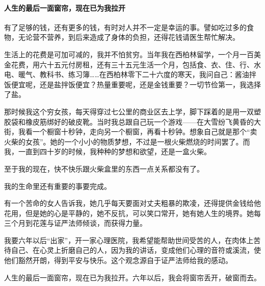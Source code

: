 \paragraph*{人生的最后一面窗帘，现在已为我拉开}
\par 有了足够的钱，还有更多的钱，有时对人并不一定是幸运的事。譬如吃过多的食物，无论营不营养，到后来造成了身体的负担，还得花钱请医生帮忙解决。
\par 生活上的花费是可加可减的，我并不怕贫穷。当年我在西柏林留学，一个月一百美金花费，用六十五元付房租，还有三十五元生活一个月，包括食、衣、住、行、水电、暖气、教科书、练习簿……在西柏林零下二十六度的寒天，我问自己：酱油拌饭便宜呢，还是盐拌饭便宜？热量重要呢，还是金钱重要？一切节俭第一，我选择了盐。
\par 那时候我这个穷女孩，每天得穿过七公里的商业区去上学，脚下踩着的是用一双塑胶袋和橡皮筋绑好的破皮靴。当时我总跟自己玩一个游戏——在大雪纷飞黄昏的大街，我看一个橱窗十秒钟，走向另一个橱窗，再看十秒钟。想象自己就是那个“卖火柴的女孩”。她的一个小小的物质梦想，不过是一根火柴燃烧的时间罢了。而我，一直到四十岁的时候，我种种的梦想和欲望，还是一盒火柴。
\par 至于我的现在，快不快乐跟火柴盒里的东西一点关系都没有了。
\par 我的生命里还有重要的事要完成。
\par 有一个苦命的女人告诉我，她几乎每天要面对丈夫粗暴的欺凌，还得提供金钱给他花用，但是她的心是平静的，她不反抗，可以笑口常开，她有她人生的境界。她每三个月到花莲与证严法师倾谈，而获得力量。
\par 我要六年以后“出家”，开一家心理医院，我希望能帮助世间受苦的人，在肉体上苦待自己、在心灵上折磨自己的人，因为我的讲话，变成他们心理的音符或溪流，使他们豁然开朗，得到平安与快乐。这个观念源自于证严法师给我的感动。
\par 人生的最后一面窗帘，现在已为我拉开。六年以后，我会将窗帘丢开，破窗而去。
